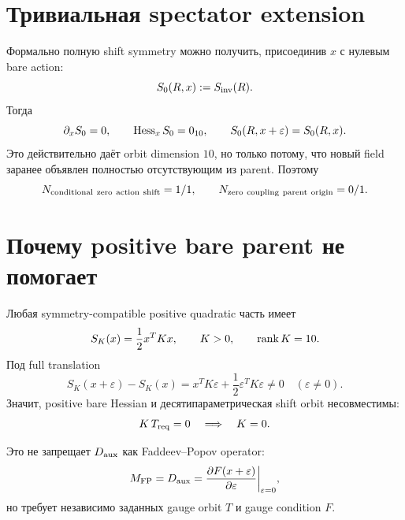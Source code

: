 \section{Тривиальная spectator extension}

Формально полную shift symmetry можно получить, присоединив $x$ с нулевым
bare action:
\begin{equation}
 S_0(R,x):=S_{\rm inv}(R).
 \label{eq:v9-kms-brst-shift-trivial-extension}
\end{equation}
Тогда
\begin{equation}
 \partial_xS_0=0,
 \qquad
 \operatorname{Hess}_xS_0=0_{10},
 \qquad
 S_0(R,x+\varepsilon)=S_0(R,x).
 \label{eq:v9-kms-brst-shift-flat-hessian}
\end{equation}
Это действительно даёт orbit dimension $10$, но только потому, что новый
field заранее объявлен полностью отсутствующим из parent. Поэтому
\begin{equation}
 N_{\rm conditional\ zero\ action\ shift}=1/1,
 \qquad
 N_{\rm zero\ coupling\ parent\ origin}=0/1.
 \label{eq:v9-kms-brst-shift-trivial-ledger}
\end{equation}

\section{Почему positive bare parent не помогает}

Любая symmetry-compatible positive quadratic часть имеет
\begin{equation}
 S_K(x)=\frac12x^TKx,
 \qquad K>0,
 \qquad \operatorname{rank} K=10.
 \label{eq:v9-kms-brst-shift-positive-parent}
\end{equation}
Под full translation
\begin{equation}
 S_K(x+\varepsilon)-S_K(x)
 =x^TK\varepsilon+\frac12\varepsilon^TK\varepsilon\neq0
 \quad(\varepsilon\neq0).
 \label{eq:v9-kms-brst-shift-breaking}
\end{equation}
Значит, positive bare Hessian и десятипараметрическая shift orbit
несовместимы:
\begin{equation}
 K\,T_{\rm req}=0
 \quad\Longrightarrow\quad
 K=0.
 \label{eq:v9-kms-brst-shift-hessian-no-go}
\end{equation}

Это не запрещает $D_{\rm aux}$ как Faddeev--Popov operator:
\begin{equation}
 M_{\rm FP}=D_{\rm aux}
 =\frac{\partial F(x+\varepsilon)}{\partial\varepsilon}\bigg|_{\varepsilon=0},
 \label{eq:v9-kms-brst-shift-fp-linearization}
\end{equation}
но требует независимо заданных gauge orbit $T$ и gauge condition $F$.

